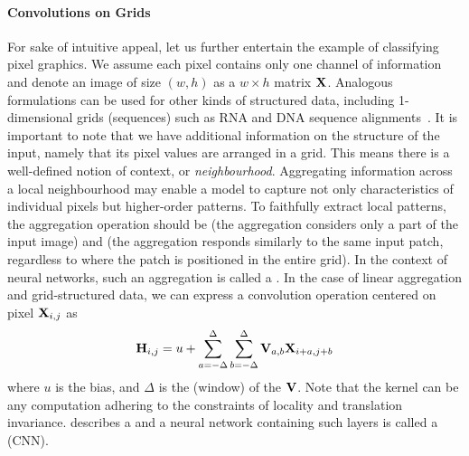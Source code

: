 \documentclass[
	fontsize=10pt, %
	twoside=false, %
	secnumdepth=1, %
  toc=indentunnumbered %
]{kaobook}
\begin{document}
\paragraph{Convolutions on Grids}
For sake of intuitive appeal, let us further entertain the example of
classifying pixel graphics. We assume each pixel contains only one channel of
information and denote an image of size $(w,h)$ as a $w \times h$ matrix $\mathbf{X}$. Analogous formulations can be used for other kinds of structured data,
including 1-dimensional grids (sequences) such as RNA and DNA sequence
alignments~\cite{flagel_UnreasonableEffectivenessConvolutional_2019,aoki_ConvolutionalNeuralNetworks_2018}.
It is important to note that we have additional information on the structure of
the input,
namely that its pixel values are arranged in a grid. This means there is a
well-defined notion of context, or \textit{neighbourhood}.
%
Aggregating information across a local neighbourhood may enable
a model to capture not only characteristics of individual pixels but
higher-order patterns. To faithfully extract local patterns, the aggregation
operation should be  (the aggregation considers only a part of the
input image) and  (the aggregation responds
similarly to the same input patch, regardless to where the patch is positioned in the
entire grid). In the context of neural networks, such an aggregation is called a
 \cite{zhang_dive_nodate}. In the case of linear aggregation
and grid-structured data, we can express a convolution operation centered on pixel $\mathbf{X}_{i,j}$ as
\begin{align}
  \mathbf{H}_{i,j} = u + \sum_{a= -\Delta}^\Delta \sum_{b = -\Delta}^\Delta \mathbf{V}_{a,b} \mathbf{X}_{i+a,j+b}
  \label{eq:convolution}
\end{align}
where $u$ is the bias, and $\Delta$ is the (window)  of the
 $\mathbf{V}$.
%
Note that the kernel can be any
computation adhering to the constraints of locality and translation invariance.
%
 describes a
 and a neural network containing such layers is called
a  (CNN).
\end{document}

